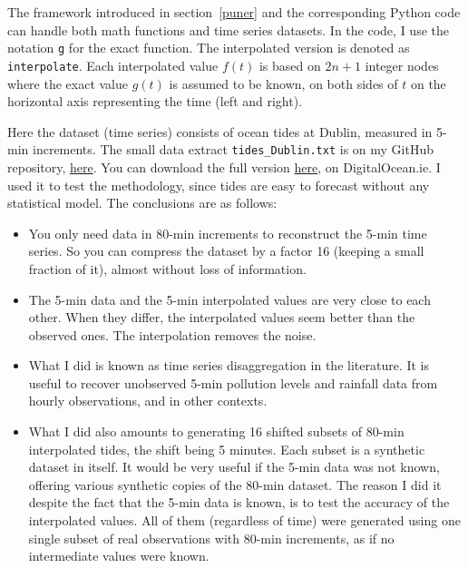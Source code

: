 \documentclass[oneside,10pt]{book}
\begin{document}
The framework introduced in section~\ref{puner} and the corresponding Python code can handle both math functions and time series datasets. In the code, I use the notation \texttt{g} for the exact function. The interpolated version 
is denoted as \texttt{interpolate}. Each interpolated value $f(t)$ is based on $2n+1$ integer nodes where the exact value $g(t)$ is assumed to be known, on both sides of $t$ on the horizontal axis representing the time (left and right).

Here the dataset (time series) consists of ocean tides at Dublin, measured in 5-min increments. The small data extract
 \texttt{tides\_Dublin.txt} is on my GitHub repository, \href{https://github.com/VincentGranville/Statistical-Optimization/blob/main/tides_Dublin.txt}{here}. You can download the full version \href{https://www.digitalocean.ie/Data/DownloadTideData}{here},
 on DigitalOcean.ie. I used it to test the methodology, since tides are easy to forecast without any statistical model.  
The conclusions are as follows: \vspace{1ex}
\begin{itemize}
\item You only need data in 80-min increments to reconstruct the 5-min time series. So you can compress the dataset by a factor 16 (keeping a small fraction of it), almost without loss of information.
\item The 5-min data and the 5-min interpolated values are very close to each other. When they differ, the interpolated values seem better than the observed ones. The interpolation removes the noise. 
\item What I did is known as time series \textcolor{index}{disaggregation} in the literature. It is useful to recover unobserved 5-min pollution levels and rainfall data from hourly observations, and in other contexts.  
\item What I did also amounts to generating 16 shifted subsets of 80-min interpolated tides, the shift being 5 minutes. 
Each subset is a synthetic dataset in itself. It would be very useful if the 5-min data was not known, offering various synthetic copies
 of the 80-min dataset.  The reason I did it despite the fact that the 5-min data is known, is to test the accuracy of the interpolated values. All of them (regardless of time) were generated using one single subset of real observations with 80-min increments, as if no intermediate values were known. 
\end{itemize} \vspace{1ex}
\end{document}
